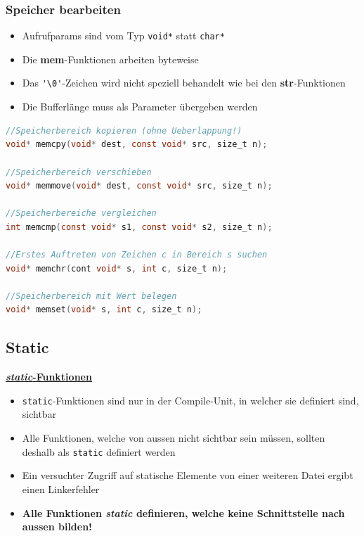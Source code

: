 		\subsubsection{Speicher bearbeiten}
			\begin{itemize}
				\item Aufrufparams sind vom Typ \verb|void*| statt \verb|char*|
				\item Die \textbf{mem}-Funktionen arbeiten byteweise
				\item Das \verb|'\0'|-Zeichen wird nicht speziell behandelt wie bei den \textbf{str}-Funktionen
				\item Die Bufferlänge muss als Parameter übergeben werden
			\end{itemize}
			\begin{lstlisting}[language=C]
//Speicherbereich kopieren (ohne Ueberlappung!)
void* memcpy(void* dest, const void* src, size_t n);

//Speicherbereich verschieben
void* memmove(void* dest, const void* src, size_t n);

//Speicherbereiche vergleichen
int memcmp(const void* s1, const void* s2, size_t n);

//Erstes Auftreten von Zeichen c in Bereich s suchen
void* memchr(cont void* s, int c, size_t n);

//Speicherbereich mit Wert belegen
void* memset(void* s, int c, size_t n);
			\end{lstlisting}

	\subsection{Static}
		\underline{\textbf{\textit{static}-Funktionen}}
			\begin{itemize}
				\item \verb|static|-Funktionen sind nur in der Compile-Unit, in welcher sie definiert sind, sichtbar
				\item Alle Funktionen, welche von aussen nicht sichtbar sein müssen, sollten deshalb als \verb|static| definiert werden
				\item Ein versuchter Zugriff auf statische Elemente von einer weiteren Datei ergibt einen Linkerfehler
				\item \textbf{Alle Funktionen \textit{static} definieren, welche keine Schnittstelle nach aussen bilden!}
			\end{itemize}
		
